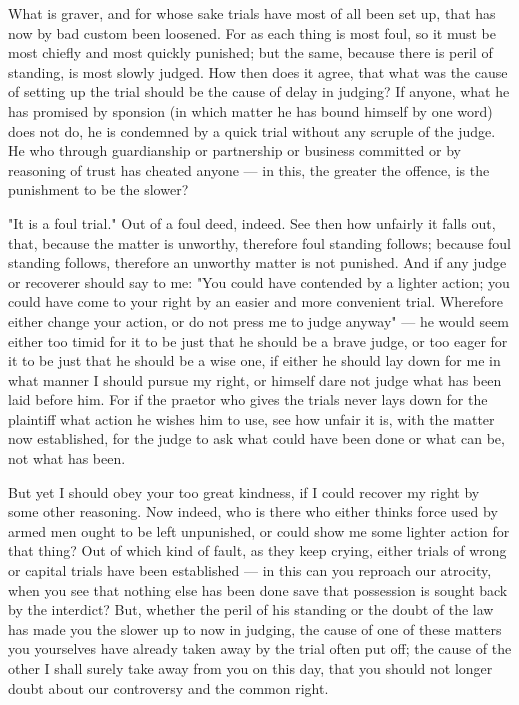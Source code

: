  What is graver, and for whose sake trials have most of all been set up, that has now by bad custom been loosened. For as each thing is most foul, so it must be most chiefly and most quickly punished; but the same, because there is peril of standing, is most slowly judged. How then does it agree, that what was the cause of setting up the trial should be the cause of delay in judging? If anyone, what he has promised by sponsion (in which matter he has bound himself by one word) does not do, he is condemned by a quick trial without any scruple of the judge. He who through guardianship or partnership or business committed or by reasoning of trust has cheated anyone --- in this, the greater the offence, is the punishment to be the slower?

 "It is a foul trial." Out of a foul deed, indeed. See then how unfairly it falls out, that, because the matter is unworthy, therefore foul standing follows; because foul standing follows, therefore an unworthy matter is not punished. And if any judge or recoverer should say to me: "You could have contended by a lighter action; you could have come to your right by an easier and more convenient trial. Wherefore either change your action, or do not press me to judge anyway" --- he would seem either too timid for it to be just that he should be a brave judge, or too eager for it to be just that he should be a wise one, if either he should lay down for me in what manner I should pursue my right, or himself dare not judge what has been laid before him. For if the praetor who gives the trials never lays down for the plaintiff what action he wishes him to use, see how unfair it is, with the matter now established, for the judge to ask what could have been done or what can be, not what has been.

 But yet I should obey your too great kindness, if I could recover my right by some other reasoning. Now indeed, who is there who either thinks force used by armed men ought to be left unpunished, or could show me some lighter action for that thing? Out of which kind of fault, as they keep crying, either trials of wrong or capital trials have been established --- in this can you reproach our atrocity, when you see that nothing else has been done save that possession is sought back by the interdict? But, whether the peril of his standing or the doubt of the law has made you the slower up to now in judging, the cause of one of these matters you yourselves have already taken away by the trial often put off; the cause of the other I shall surely take away from you on this day, that you should not longer doubt about our controversy and the common right.

